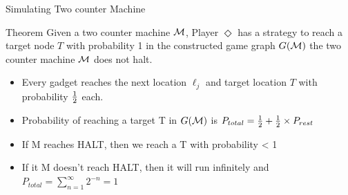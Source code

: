 \documentclass{beamer}
\begin{document}
   \begin{frame}{Simulating Two counter Machine}
     \begin{alertblock}{Theorem}
   Given a two counter machine $\cal{M}$, Player $\Diamond$ has a
   strategy to reach a target node $T$  with probability 1
   in the constructed game graph $G(\cal{M})$ \Iff the two counter
   machine $\cal{M}$ does not halt.
 \end{alertblock}
 \begin{itemize}
   \item Every gadget reaches the next location $\ell_j$ and target
     location $T$ with probability $\frac{1}{2}$ each.
     \item Probability of reaching a target T in $G(\cal{M})$ is $P_{total} = \frac{1}{2}
       + \frac{1}{2}\times P_{rest}$
       \item If M reaches HALT, then we reach a T with probability < 1

         \item If it M doesn't reach HALT, then it will run infinitely
           and $P_{total} = \sum_{n=1}^\infty 2^{-n} = 1$
   \end{itemize}
     \end{frame}

\end{document}
